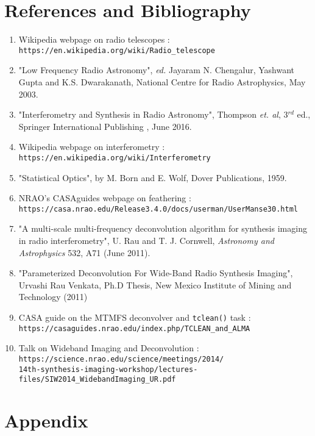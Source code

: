 \documentclass{article}
\begin{document}
\section{References and Bibliography}
\begin{enumerate}
\label{ref1}\item Wikipedia webpage on radio telescopes : \texttt{https://en.wikipedia.org/wiki/Radio\_telescope}
\label{ref2} \item "Low Frequency Radio Astronomy", \textit{ed.} Jayaram N. Chengalur, Yashwant Gupta and K.S. Dwarakanath, National Centre for Radio Astrophysics, May 2003. 
\label{ref3} \item "Interferometry and Synthesis in Radio Astronomy", Thompson \textit{et. al}, 3$^{rd}$ ed., Springer International Publishing , June 2016. 
\label{ref4}\item  Wikipedia webpage on interferometry : \texttt{https://en.wikipedia.org/wiki/Interferometry}
\label{ref5}\item "Statistical Optics", by M. Born and E. Wolf, Dover Publications, 1959.
\label{ref6}\item NRAO's CASAguides webpage on feathering : \\ \texttt{https://casa.nrao.edu/Release3.4.0/docs/userman/UserManse30.html}
\label{urvpaper}\item "A multi-scale multi-frequency deconvolution algorithm
for synthesis imaging in radio interferometry", U. Rau and T. J. Cornwell, \textit{Astronomy and Astrophysics} 532, A71 (June 2011).
\label{urvthesis}\item "Parameterized Deconvolution For Wide-Band Radio Synthesis Imaging", Urvashi Rau Venkata, Ph.D Thesis, New Mexico Institute of Mining and Technology (2011)
\label{ref9} \item CASA guide on the MTMFS deconvolver and \texttt{tclean()} task : \\
\texttt{https://casaguides.nrao.edu/index.php/TCLEAN\_and\_ALMA}
\label{ref10}\item Talk on Wideband Imaging and Deconvolution : \\ \texttt{https://science.nrao.edu/science/meetings/2014/\\14th-synthesis-imaging-workshop/lectures-files/SIW2014\_WidebandImaging\_UR.pdf}
\end{enumerate}
\section{Appendix}
\end{document}

